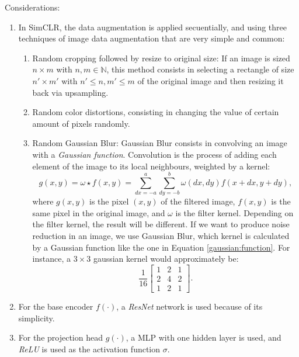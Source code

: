 Considerations:
\begin{enumerate}
\item In SimCLR, the data augmentation is applied secuentially, and using three techniques of image data augmentation that are very simple and common:
\begin{enumerate}
\item Random cropping followed by resize to original size: If an image is sized $n\times m$ with $n,m \in \mathbb N$, this method consists in selecting a rectangle of size $n'\times m'$ with $n' \leq n, m' \leq m$ of the original image and then resizing it back via upsampling\footnotemark.
\item Random color distortions, consisting in changing the value of certain amount of pixels randomly.
\item Random Gaussian Blur: Gaussian Blur consists in convolving an image with a \emph{Gaussian function}. Convolution is the process of adding each element of the image to its local neighbours, weighted by a kernel:
\[
g(x,y) = \omega \star f(x,y) = \sum_{dx = -a}^a \sum_{dy = -b}^b \omega(dx,dy)f(x+dx,y+dy),    
\]
where $g(x,y)$ is the pixel $(x,y)$ of the filtered image, $f(x,y)$ is the same pixel in the original image, and $\omega$ is the filter kernel. Depending on the filter kernel, the result will be different. If we want to produce noise reduction in an image, we use Gaussian Blur, which kernel is calculated by a Gaussian function like the one in Equation \ref{gaussian:function}. For instance, a $3\times 3 $ gaussian kernel would approximately be:
\[
\frac{1}{16}\begin{bmatrix}
    1 & 2 & 1\\
    2 & 4 & 2\\
    1 & 2 & 1
\end{bmatrix}.
\]

\end{enumerate}

\item For the base encoder $f(\cdot)$, a \emph{ResNet} network is used because of its simplicity.
\item For the projection head $g(\cdot)$, a MLP with one hidden layer is used, and \emph{ReLU} is used as the activation function $\sigma$.
\end{enumerate}


